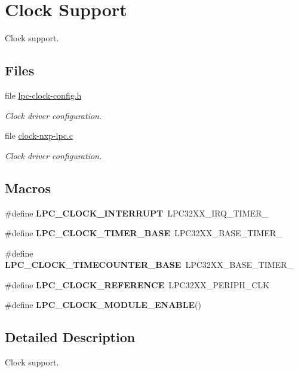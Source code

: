 \hypertarget{group__lpc__clock}{}\section{Clock Support}
\label{group__lpc__clock}


Clock support.  


\subsection*{Files}
\begin{DoxyCompactItemize}
\item 
file \mbox{\hyperlink{lpc32xx_2include_2bsp_2lpc-clock-config_8h}{lpc-\/clock-\/config.\+h}}
\begin{DoxyCompactList}\small\item\em Clock driver configuration. \end{DoxyCompactList}\item 
file \mbox{\hyperlink{clock-nxp-lpc_8c}{clock-\/nxp-\/lpc.\+c}}
\begin{DoxyCompactList}\small\item\em Clock driver configuration. \end{DoxyCompactList}\end{DoxyCompactItemize}
\subsection*{Macros}
\begin{DoxyCompactItemize}
\item 
\mbox{\label{group__lpc__clock_gac1220f34104208e6ff5cfdd6b398aba8}} 
\#define {\bfseries L\+P\+C\+\_\+\+C\+L\+O\+C\+K\+\_\+\+I\+N\+T\+E\+R\+R\+U\+PT}~L\+P\+C32\+X\+X\+\_\+\+I\+R\+Q\+\_\+\+T\+I\+M\+E\+R\+\_
\item 
\mbox{\label{group__lpc__clock_gab76011fa470983732aa4646723ff94f5}} 
\#define {\bfseries L\+P\+C\+\_\+\+C\+L\+O\+C\+K\+\_\+\+T\+I\+M\+E\+R\+\_\+\+B\+A\+SE}~L\+P\+C32\+X\+X\+\_\+\+B\+A\+S\+E\+\_\+\+T\+I\+M\+E\+R\+\_
\item 
\mbox{\label{group__lpc__clock_gac46820b8bec32680b474d61bebb1b7d1}} 
\#define {\bfseries L\+P\+C\+\_\+\+C\+L\+O\+C\+K\+\_\+\+T\+I\+M\+E\+C\+O\+U\+N\+T\+E\+R\+\_\+\+B\+A\+SE}~L\+P\+C32\+X\+X\+\_\+\+B\+A\+S\+E\+\_\+\+T\+I\+M\+E\+R\+\_
\item 
\mbox{\label{group__lpc__clock_gaddc938908b1ed7eb314ba94b0cf188ef}} 
\#define {\bfseries L\+P\+C\+\_\+\+C\+L\+O\+C\+K\+\_\+\+R\+E\+F\+E\+R\+E\+N\+CE}~L\+P\+C32\+X\+X\+\_\+\+P\+E\+R\+I\+P\+H\+\_\+\+C\+LK
\item 
\mbox{\label{group__lpc__clock_ga9e10fd86cae2310ffaee1a8478d35cd0}} 
\#define {\bfseries L\+P\+C\+\_\+\+C\+L\+O\+C\+K\+\_\+\+M\+O\+D\+U\+L\+E\+\_\+\+E\+N\+A\+B\+LE}()
\end{DoxyCompactItemize}


\subsection{Detailed Description}
Clock support. 

